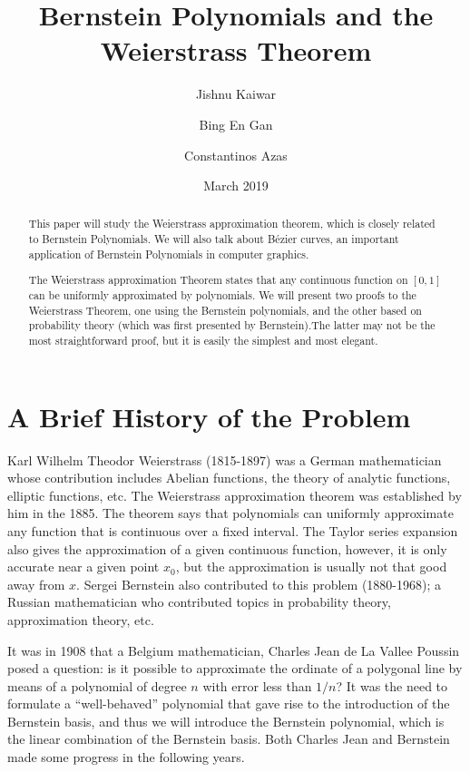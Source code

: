 \documentclass{article}
\title{Bernstein Polynomials and the Weierstrass Theorem}
\author{Jishnu Kaiwar
  \and
  Bing En Gan
  \and
  Constantinos Azas}
\date{March 2019}
\begin{document}
\maketitle
\begin{abstract}
This paper will study the Weierstrass approximation theorem, which is closely related to Bernstein Polynomials. We will also talk about B\'ezier curves, an important application of Bernstein Polynomials in computer graphics.

The Weierstrass approximation Theorem states that any continuous function on $[0,1]$ can be uniformly approximated by polynomials.
We will present two proofs to the Weierstrass Theorem, one using the Bernstein polynomials, and the other based on probability theory (which was first presented by Bernstein).The latter may not be the most straightforward proof, but it is easily the simplest and most elegant.
\end{abstract}
\newpage
\tableofcontents

\section{A Brief History of the Problem}\label{sec:hist}
Karl Wilhelm Theodor Weierstrass (1815-1897) was a German mathematician whose contribution includes Abelian functions, the theory of analytic functions, elliptic functions, etc.
The Weierstrass approximation theorem was established by him in the 1885.
The theorem says that polynomials can uniformly approximate any function that is continuous over a fixed interval.
The Taylor series expansion also gives the approximation of a given continuous function, however, it is only accurate near a given point $x_0$, but the approximation is usually not that good away from $x$.
Sergei Bernstein also contributed to this problem (1880-1968); a Russian mathematician who contributed topics in probability theory, approximation theory, etc.

It was in 1908 that a Belgium mathematician, Charles Jean de La Vallee Poussin posed a question: is it possible to approximate the ordinate of a polygonal line by means of a polynomial of degree $n$ with error less than $1/n$?
It was the need to formulate a ``well-behaved'' polynomial that gave rise to the introduction of the Bernstein basis, and thus we will introduce the Bernstein polynomial, which is the linear combination of the Bernstein basis.
Both Charles Jean and Bernstein made some progress in the following years.
\end{document}
